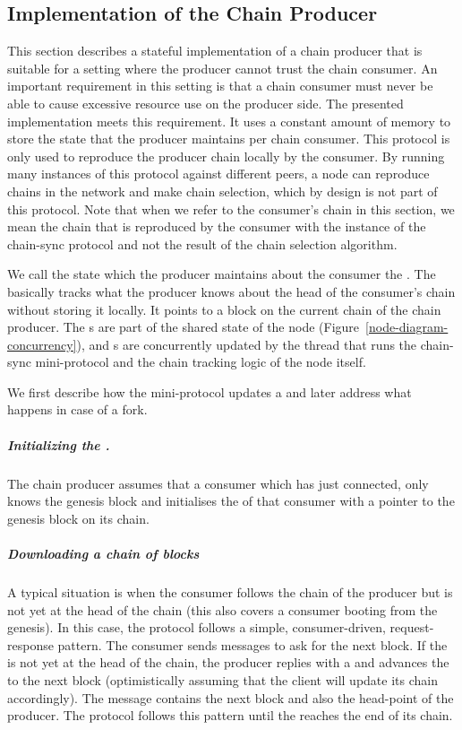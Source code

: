 \subsection{Implementation of the Chain Producer}
This section describes a stateful implementation of a chain producer that is suitable for a setting where
the producer cannot trust the chain consumer.
An important requirement in this setting
is that a chain consumer must never be able to cause excessive resource use on the producer side.
The presented implementation meets this requirement.
It uses a constant amount of memory to store the state that the producer maintains
per chain consumer.  This protocol is only used to reproduce the producer
chain locally by the consumer.  By running many instances of this protocol against
different peers, a node can reproduce chains in the network and
make chain selection, which by design is not part of this protocol.
Note that when we refer to the consumer's chain in this section, we mean
the chain that is reproduced by the consumer with the instance of
the chain-sync protocol and not the result of the chain selection algorithm.

We call the state which the producer maintains about the consumer the \readpointer{}.
The \readpointer{} basically tracks what the producer knows about the head of
the consumer's chain without storing it locally.
It points to a block on the current chain of the chain producer.
The \readpointer{}s are part of the shared state of the node (Figure~\ref{node-diagram-concurrency}), and
\readpointer{}s are concurrently updated by the thread that runs the chain-sync mini-protocol and the
chain tracking logic of the node itself.

We first describe how the mini-protocol updates a \readpointer{} and later address what happens in case
of a fork.
\subparagraph{Initializing the \readpointer{}.}
The chain producer assumes that a consumer which has just connected,
only knows the genesis block and initialises the \readpointer{} of that consumer
with a pointer to the genesis block on its chain.

\subparagraph{Downloading a chain of blocks}
A typical situation is when the consumer follows the chain of the producer but is not yet at the head of the
chain (this also covers a consumer booting from the genesis).
In this case, the protocol follows a simple, consumer-driven, request-response pattern.
The consumer sends \MsgRequestNext{} messages to ask for the next block.
If the \readpointer{} is not yet at the head of the chain,
the producer replies with a \MsgRollForward{} and advances the \readpointer{} to
the next block (optimistically assuming that the client will update its chain
accordingly).
The \MsgRollForward{} message contains the next block and also the head-point of the producer.
The protocol follows this pattern until the \readpointer{} reaches the end of its chain.

